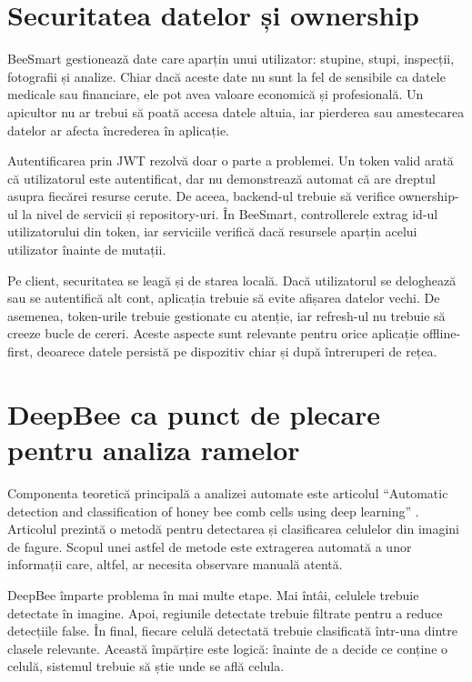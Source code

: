 \section{Securitatea datelor și ownership}

BeeSmart gestionează date care aparțin unui utilizator: stupine, stupi, inspecții, fotografii și analize. Chiar dacă aceste date nu sunt la fel de sensibile ca datele medicale sau financiare, ele pot avea valoare economică și profesională. Un apicultor nu ar trebui să poată accesa datele altuia, iar pierderea sau amestecarea datelor ar afecta încrederea în aplicație.

Autentificarea prin JWT rezolvă doar o parte a problemei. Un token valid arată că utilizatorul este autentificat, dar nu demonstrează automat că are dreptul asupra fiecărei resurse cerute. De aceea, backend-ul trebuie să verifice ownership-ul la nivel de servicii și repository-uri. În BeeSmart, controllerele extrag id-ul utilizatorului din token, iar serviciile verifică dacă resursele aparțin acelui utilizator înainte de mutații.

Pe client, securitatea se leagă și de starea locală. Dacă utilizatorul se deloghează sau se autentifică alt cont, aplicația trebuie să evite afișarea datelor vechi. De asemenea, token-urile trebuie gestionate cu atenție, iar refresh-ul nu trebuie să creeze bucle de cereri. Aceste aspecte sunt relevante pentru orice aplicație offline-first, deoarece datele persistă pe dispozitiv chiar și după întreruperi de rețea.

\section{DeepBee ca punct de plecare pentru analiza ramelor}

Componenta teoretică principală a analizei automate este articolul \enquote{Automatic detection and classification of honey bee comb cells using deep learning} \cite{deepbeeArticle}. Articolul prezintă o metodă pentru detectarea și clasificarea celulelor din imagini de fagure. Scopul unei astfel de metode este extragerea automată a unor informații care, altfel, ar necesita observare manuală atentă.

DeepBee împarte problema în mai multe etape. Mai întâi, celulele trebuie detectate în imagine. Apoi, regiunile detectate trebuie filtrate pentru a reduce detecțiile false. În final, fiecare celulă detectată trebuie clasificată într-una dintre clasele relevante. Această împărțire este logică: înainte de a decide ce conține o celulă, sistemul trebuie să știe unde se află celula.

